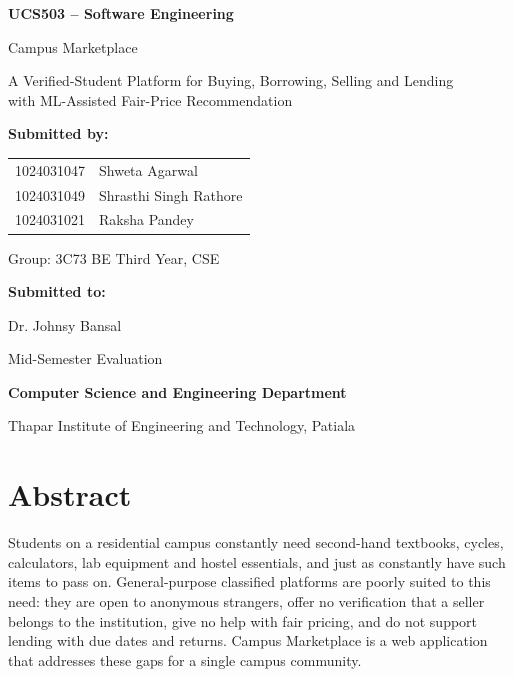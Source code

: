 \documentclass[11pt,letterpaper,oneside]{report}
\begin{document}
\begin{titlepage}
\centering
{\bfseries UCS503 -- Software Engineering\par}
\vspace{2.6cm}
{\fontsize{24}{30}\selectfont Campus Marketplace\par}
\vspace{0.4cm}
{\small A Verified-Student Platform for Buying, Borrowing, Selling and Lending\\
with ML-Assisted Fair-Price Recommendation\par}
\vspace{2.2cm}
{\large\bfseries Submitted by:\par}
\vspace{0.4cm}
{\small
\begin{tabular}{ll}
1024031047 & Shweta Agarwal\\
1024031049 & Shrasthi Singh Rathore\\
1024031021 & Raksha Pandey\\
\end{tabular}\par}
\vspace{0.6cm}
{\small Group: 3C73 \quad BE Third Year, CSE\par}
\vspace{2.0cm}
{\large\bfseries Submitted to:\par}
\vspace{0.4cm}
{\small Dr. Johnsy Bansal\par}
\vfill
{\small Mid-Semester Evaluation\par}
\vspace{0.4cm}
{\bfseries Computer Science and Engineering Department\par}
\vspace{0.2cm}
{Thapar Institute of Engineering and Technology, Patiala\par}
\end{titlepage}

\setcounter{page}{1}
\chapter*{Abstract}
\thispagestyle{plain}

Students on a residential campus constantly need second-hand textbooks, cycles, calculators, lab
equipment and hostel essentials, and just as constantly have such items to pass on. General-purpose
classified platforms are poorly suited to this need: they are open to anonymous strangers, offer no
verification that a seller belongs to the institution, give no help with fair pricing, and do not support
lending with due dates and returns. Campus Marketplace is a web application that addresses these
gaps for a single campus community.
\end{document}
